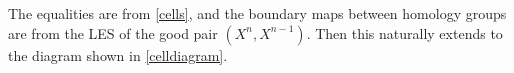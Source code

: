 \begin{figure}[H]
\centering
{}
\end{figure}
The equalities are from \cref{cells}, and the boundary maps between homology groups are from the LES of the good pair $(X^n,X^{n-1})$. Then this naturally extends to the diagram shown in \cref{celldiagram}. 
